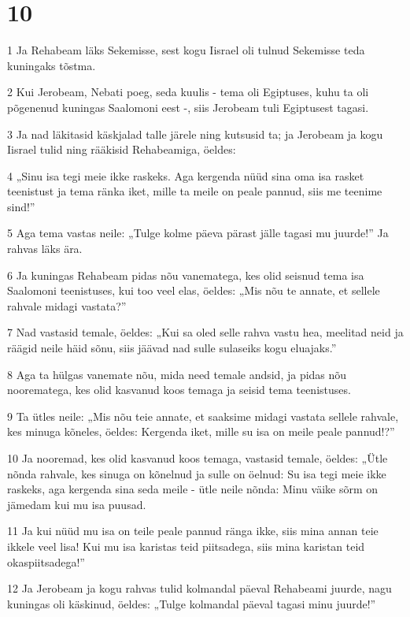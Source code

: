 \chapter{10}

\par 1 Ja Rehabeam läks Sekemisse, sest kogu Iisrael oli tulnud Sekemisse teda kuningaks tõstma.
\par 2 Kui Jerobeam, Nebati poeg, seda kuulis - tema oli Egiptuses, kuhu ta oli põgenenud kuningas Saalomoni eest -, siis Jerobeam tuli Egiptusest tagasi.
\par 3 Ja nad läkitasid käskjalad talle järele ning kutsusid ta; ja Jerobeam ja kogu Iisrael tulid ning rääkisid Rehabeamiga, öeldes:
\par 4 „Sinu isa tegi meie ikke raskeks. Aga kergenda nüüd sina oma isa rasket teenistust ja tema ränka iket, mille ta meile on peale pannud, siis me teenime sind!”
\par 5 Aga tema vastas neile: „Tulge kolme päeva pärast jälle tagasi mu juurde!” Ja rahvas läks ära.
\par 6 Ja kuningas Rehabeam pidas nõu vanematega, kes olid seisnud tema isa Saalomoni teenistuses, kui too veel elas, öeldes: „Mis nõu te annate, et sellele rahvale midagi vastata?”
\par 7 Nad vastasid temale, öeldes: „Kui sa oled selle rahva vastu hea, meelitad neid ja räägid neile häid sõnu, siis jäävad nad sulle sulaseiks kogu eluajaks.”
\par 8 Aga ta hülgas vanemate nõu, mida need temale andsid, ja pidas nõu noorematega, kes olid kasvanud koos temaga ja seisid tema teenistuses.
\par 9 Ta ütles neile: „Mis nõu teie annate, et saaksime midagi vastata sellele rahvale, kes minuga kõneles, öeldes: Kergenda iket, mille su isa on meile peale pannud!?”
\par 10 Ja nooremad, kes olid kasvanud koos temaga, vastasid temale, öeldes: „Ütle nõnda rahvale, kes sinuga on kõnelnud ja sulle on öelnud: Su isa tegi meie ikke raskeks, aga kergenda sina seda meile - ütle neile nõnda: Minu väike sõrm on jämedam kui mu isa puusad.
\par 11 Ja kui nüüd mu isa on teile peale pannud ränga ikke, siis mina annan teie ikkele veel lisa! Kui mu isa karistas teid piitsadega, siis mina karistan teid okaspiitsadega!”
\par 12 Ja Jerobeam ja kogu rahvas tulid kolmandal päeval Rehabeami juurde, nagu kuningas oli käskinud, öeldes: „Tulge kolmandal päeval tagasi minu juurde!”
